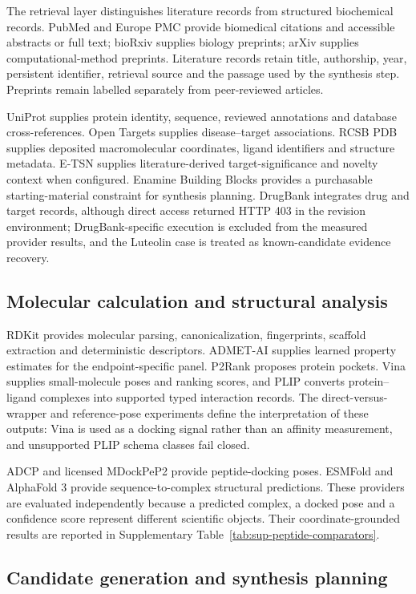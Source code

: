 \documentclass{article}
\begin{document}
The retrieval layer distinguishes literature records from structured biochemical records. PubMed and Europe PMC provide biomedical citations and accessible abstracts or full text; bioRxiv supplies biology preprints; arXiv supplies computational-method preprints. Literature records retain title, authorship, year, persistent identifier, retrieval source and the passage used by the synthesis step. Preprints remain labelled separately from peer-reviewed articles.

UniProt supplies protein identity, sequence, reviewed annotations and database cross-references. Open Targets supplies disease--target associations. RCSB PDB supplies deposited macromolecular coordinates, ligand identifiers and structure metadata. E-TSN supplies literature-derived target-significance and novelty context when configured. Enamine Building Blocks provides a purchasable starting-material constraint for synthesis planning. DrugBank integrates drug and target records, although direct access returned HTTP 403 in the revision environment; DrugBank-specific execution is excluded from the measured provider results, and the Luteolin case is treated as known-candidate evidence recovery.

\subsection{Molecular calculation and structural analysis}

RDKit provides molecular parsing, canonicalization, fingerprints, scaffold extraction and deterministic descriptors. ADMET-AI supplies learned property estimates for the endpoint-specific panel. P2Rank proposes protein pockets. Vina supplies small-molecule poses and ranking scores, and PLIP converts protein--ligand complexes into supported typed interaction records. The direct-versus-wrapper and reference-pose experiments define the interpretation of these outputs: Vina is used as a docking signal rather than an affinity measurement, and unsupported PLIP schema classes fail closed.

ADCP and licensed MDockPeP2 provide peptide-docking poses. ESMFold and AlphaFold 3 provide sequence-to-complex structural predictions. These providers are evaluated independently because a predicted complex, a docked pose and a confidence score represent different scientific objects. Their coordinate-grounded results are reported in Supplementary Table~\ref{tab:sup-peptide-comparators}.

\subsection{Candidate generation and synthesis planning}
\end{document}

